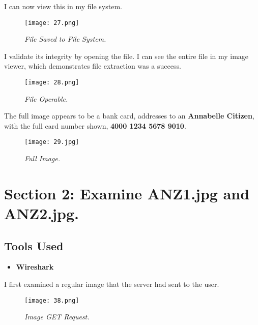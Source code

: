 I can now view this in my file system.

\begin{figure}[H]
    \setlength{\abovecaptionskip}{20pt}
    \setlength{\belowcaptionskip}{0pt}
    \centering
    \texttt{[image: 27.png]}
    \captionsetup{justification=centering}
    \caption{\textit{File Saved to File System.}}
    \label{fig:27}
\end{figure}
\vspace{-10pt}

I validate its integrity by opening the file. I can see the entire file in my image viewer, which demonstrates file extraction was a success.

\begin{figure}[H]
    \setlength{\abovecaptionskip}{20pt}
    \setlength{\belowcaptionskip}{0pt}
    \centering
    \texttt{[image: 28.png]}
    \captionsetup{justification=centering}
    \caption{\textit{File Operable.}}
    \label{fig:28}
\end{figure}
\vspace{-10pt}

The full image appears to be a bank card, addresses to an \textbf{Annabelle Citizen}, with the full card number shown, \textbf{4000 1234 5678 9010}. 

\begin{figure}[H]
    \setlength{\abovecaptionskip}{20pt}
    \setlength{\belowcaptionskip}{0pt}
    \centering
    \texttt{[image: 29.jpg]}
    \captionsetup{justification=centering}
    \caption{\textit{Full Image.}}
    \label{fig:29}
\end{figure}
\vspace{-10pt}

\section{Section 2: Examine \textbf{ANZ1.jpg} and \textbf{ANZ2.jpg}.}
\subsection{Tools Used}
\begin{itemize}
    \item \textbf{Wireshark}
\end{itemize}

I first examined a regular image that the server had sent to the user.

\begin{figure}[H]
    \setlength{\abovecaptionskip}{20pt}
    \setlength{\belowcaptionskip}{0pt}
    \centering
    \texttt{[image: 38.png]}
    \captionsetup{justification=centering}
    \caption{\textit{Image GET Request.}}
    \label{fig:38}
\end{figure}
\vspace{-10pt}


